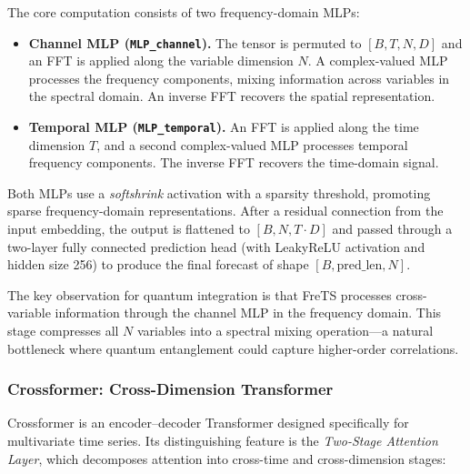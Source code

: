 \documentclass[11pt]{article}
\begin{document}
The core computation consists of two frequency-domain MLPs:
\begin{itemize}
  \item \textbf{Channel MLP (\texttt{MLP\_channel}).} The tensor is permuted to $[B, T, N, D]$ and an FFT is applied along the variable dimension $N$. A complex-valued MLP processes the frequency components, mixing information across variables in the spectral domain. An inverse FFT recovers the spatial representation.
  \item \textbf{Temporal MLP (\texttt{MLP\_temporal}).} An FFT is applied along the time dimension $T$, and a second complex-valued MLP processes temporal frequency components. The inverse FFT recovers the time-domain signal.
\end{itemize}

Both MLPs use a \emph{softshrink} activation with a sparsity threshold, promoting sparse frequency-domain representations. After a residual connection from the input embedding, the output is flattened to $[B, N, T \cdot D]$ and passed through a two-layer fully connected prediction head (with LeakyReLU activation and hidden size 256) to produce the final forecast of shape $[B, \text{pred\_len}, N]$.

The key observation for quantum integration is that FreTS processes cross-variable information through the channel MLP in the frequency domain. This stage compresses all $N$ variables into a spectral mixing operation---a natural bottleneck where quantum entanglement could capture higher-order correlations.

\subsubsection*{Crossformer: Cross-Dimension Transformer}

Crossformer is an encoder--decoder Transformer designed specifically for multivariate time series. Its distinguishing feature is the \emph{Two-Stage Attention Layer}, which decomposes attention into cross-time and cross-dimension stages:
\end{document}
